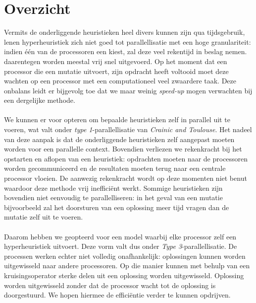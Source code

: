 \section{Overzicht}

Vermits de onderliggende heuristieken heel divers kunnen zijn qua tijdsgebruik, lenen hyperheuristiek zich niet goed tot parallellisatie met een hoge granulariteit: indien \'e\'en van de processoren een \abls{} \abh{} kiest, zal deze veel rekentijd in beslag nemen. \abmt[M]{} \abhn{} daarentegen worden meestal vrij snel uitgevoerd. Op het moment dat een processor die een mutatie uitvoert, zijn opdracht heeft voltooid moet deze wachten op een processor met een computationeel veel zwaardere taak. Deze onbalans leidt er bijgevolg toe dat we maar weinig \emph{speed-up} mogen verwachten bij een dergelijke methode.

\paragraph{}
We kunnen er voor opteren om bepaalde heuristieken zelf in parallel uit te voeren, wat valt onder \emph{type 1}-parallellisatie van \emph{Crainic and Toulouse}\cite{crainicAndToulouse}. Het nadeel van deze aanpak is dat de onderliggende heuristieken zelf aangepast moeten worden voor een parallelle context. Bovendien verliezen we rekenkracht bij het opstarten en aflopen van een heuristiek: opdrachten moeten naar de processoren worden gecommuniceerd en de resultaten moeten terug naar een centrale processor vloeien. De aanwezig rekenkracht wordt op deze momenten niet benut waardoor deze methode vrij ineffici\"ent werkt. Sommige heuristieken zijn bovendien niet eenvoudig te parallelliseren: in het geval van een mutatie bijvoorbeeld zal het doorsturen van een oplossing meer tijd vragen dan de mutatie zelf uit te voeren.

\paragraph{}
Daarom hebben we geopteerd voor een model waarbij elke processor zelf een hyperheuristiek uitvoert. Deze vorm valt dus onder \emph{Type 3}-parallellisatie. De processen werken echter niet volledig onafhankelijk: oplossingen kunnen worden uitgewisseld naar andere processoren. Op die manier kunnen met behulp van een kruisingsoperator sterke delen uit een oplossing worden uitgewisseld. Oplossing worden uitgewisseld zonder dat de processor wacht tot de oplossing is doorgestuurd. We hopen hiermee de effici\"entie verder te kunnen opdrijven.


